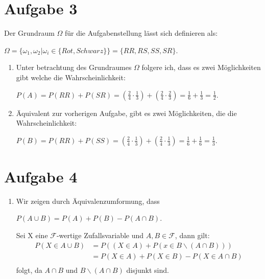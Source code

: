 \documentclass[a4paper]{scrartcl}
\begin{document}
\section*{Aufgabe 3}
Der Grundraum $\Omega$ für die Aufgabenstellung lässt sich definieren als: \vspace{6pt}
\begin{center}
    $\Omega = \{\omega_1, \omega_2 | \omega_i \in \{Rot, Schwarz\}\} = \{RR, RS, SS, SR\}$.
\end{center}
\begin{enumerate}[label=(\alph*)]
    \item Unter betrachtung des Grundraumes $\Omega$ folgere ich, dass es zwei Möglichkeiten gibt welche die Wahrscheinlichkeit: \vspace{6pt}
    \begin{center}
        $P(A) =  P(RR) + P(SR) = (\frac{2}{4} \cdot \frac{1}{3}) + (\frac{2}{4} \cdot \frac{2}{3}) = \frac{1}{6} + \frac{1}{3} = \frac{1}{2}$.
    \end{center}
    \item Äquivalent zur vorherigen Aufgabe, gibt es zwei Möglichkeiten, die die Wahrscheinlichkeit: \vspace{6pt}
    \begin{center}
        $P(B) = P(RR) + P(SS) = (\frac{2}{4} \cdot \frac{1}{3}) + (\frac{2}{4} \cdot \frac{1}{3}) = \frac{1}{6} + \frac{1}{6} = \frac{1}{3}$.
    \end{center}
\end{enumerate}

\section*{Aufgabe 4}
\begin{enumerate}[label=(\alph*)]
    \item Wir zeigen durch Äquivalenzumformung, dass
    \begin{center}
        $P(A \cup B) = P(A) + P(B) - P(A \cap B)$.
    \end{center}
    Sei X eine $\mathcal{F}$-wertige Zufallsvariable und $A, B \in \mathcal{F}$, dann gilt: \vspace{6pt}
    \[
    \begin{aligned}
    P(X \in A \cup B) &= P((X \in A) + P(x \in B \backslash (A \cap B))) \\
    &= P(X \in A) + P(X \in B) - P(X \in A \cap B) \\
    \end{aligned}    
    \] 
    folgt, da $A \cap B$ und $B \backslash (A \cap B)$ disjunkt sind.
\end{enumerate}
\end{document}
